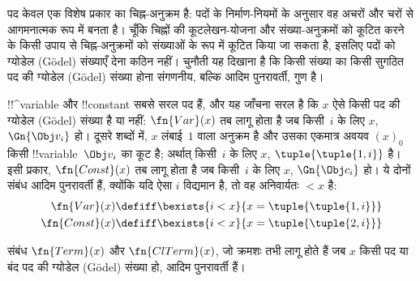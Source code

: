 \documentclass[../../../include/open-logic-section]{subfiles}
\begin{document}

\begin{explain}
पद केवल एक विशेष प्रकार का चिह्न-अनुक्रम है: पदों के निर्माण-नियमों के अनुसार
वह अचरों और चरों से आगमनात्मक रूप में बनता है। चूँकि चिह्नों की कूटलेखन-योजना
और संख्या-अनुक्रमों को कूटित करने के किसी उपाय से चिह्न-अनुक्रमों को संख्याओं
के रूप में कूटित किया जा सकता है, इसलिए पदों को ग्योडेल (G\"odel) संख्याएँ
देना कठिन नहीं। चुनौती यह दिखाना है कि किसी संख्या का किसी सुगठित पद की
ग्योडेल (G\"odel) संख्या होना संगणनीय, बल्कि आदिम पुनरावर्ती, गुण है।
\end{explain}

!!^{variable} और !!{constant} सबसे सरल पद हैं, और यह जाँचना सरल है कि $x$
ऐसे किसी पद की ग्योडेल (G\"odel) संख्या है या नहीं: $\fn{Var}(x)$ तब लागू
होता है जब किसी~$i$ के लिए $x$, $\Gn{\Obj v_i}$ हो। दूसरे शब्दों में, $x$
लंबाई~$1$ वाला अनुक्रम है और उसका एकमात्र अवयव $(x)_0$ किसी
!!{variable}~$\Obj v_i$ का कूट है; अर्थात् किसी~$i$ के लिए $x$,
$\tuple{\tuple{1, i}}$ है। इसी प्रकार, $\fn{Const}(x)$ तब लागू होता है जब
किसी~$i$ के लिए $x$, $\Gn{\Obj c_i}$ हो। ये दोनों संबंध आदिम पुनरावर्ती हैं,
क्योंकि यदि ऐसा $i$ विद्यमान है, तो वह अनिवार्यतः $< x$ है:
\begin{align*}
  \fn{Var}(x) & \defiff \bexists{i<x}{x = \tuple{\tuple{1, i}}}\\
  \fn{Const}(x) & \defiff \bexists{i<x}{x = \tuple{\tuple{2, i}}}
\end{align*}

\begin{prop}
संबंध $\fn{Term}(x)$ और $\fn{ClTerm}(x)$, जो क्रमशः तभी लागू होते हैं जब $x$
किसी पद या बंद पद की ग्योडेल (G\"odel) संख्या हो, आदिम पुनरावर्ती हैं।
\end{prop}
\end{document}
